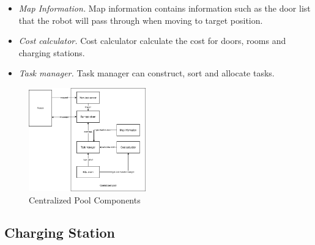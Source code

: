 \begin{itemize}
	\item \textsl{Map Information.} Map information contains information such as the door list that the robot will pass through when moving to target position.
	\item \textsl{Cost calculator.} Cost calculator calculate the cost for doors, rooms and charging stations.
	\item \textsl{Task manager.} Task manager can construct, sort and allocate tasks.
\end{itemize}
\begin{figure}[htbp]
	\centering
	\includegraphics[width = 0.45\textwidth]{content/images/ch4/system_component_centralized_pool.drawio.png}
	\caption{Centralized Pool Components}
	\label{fig:centralized_pool_components}
\end{figure}




\subsection{Charging Station}
\label{sec:charging_station}
